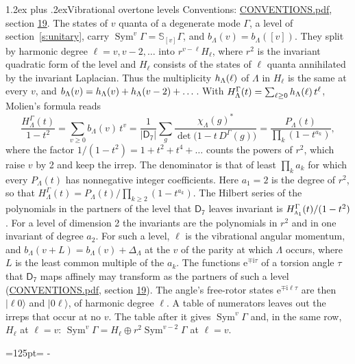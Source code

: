 \documentclass[10pt,a4paper]{article}
\makeatletter
\renewcommand\section{\@startsection{section}{1}{\z@}{-3ex plus -1ex minus -.2ex}%
  {1.2ex plus .2ex}{\normalfont\large\sffamily\bfseries\color{parttitle}}}
\newcommand{\needspace}[1]{\par\penalty-100\begingroup\dimen0=#1\relax\dimen2=\pagegoal
  \advance\dimen2-\pagetotal\ifdim\dimen0>\dimen2\relax\ifdim\dimen2>0pt\vfil\break\fi\fi
  \endgroup}
\numberwithin{equation}{section}
\newcommand{\grp}[1]{\mathsf{#1}}
\newcommand{\irr}[1]{\text{\normalfont\scshape #1}}
\newcommand{\iunit}{\mathrm{i}}
\newcommand{\expe}{\mathrm{e}}
\newcommand{\repD}[1]{D^{#1}}
\newcommand{\irchar}[1]{\chi_{#1}}
\newcommand{\conj}[1]{{#1}^{*}}
\newcommand{\schur}[1]{\mathbb{S}_{#1}}
\newcommand{\shape}[1]{[#1]}
\newcommand{\occ}[1]{\lvert #1\rangle}
\makeatother
\begin{document}
\section{Vibrational overtone levels}\label{s:overtones}
Conventions: \href{../../CONVENTIONS.pdf}{CONVENTIONS.pdf}, section \href{../../CONVENTIONS.pdf\#conv.19}{19}.
\leavevmode\label{n:index.quanta}\label{n:operator.symmetric.power}The states of $v$ quanta of a degenerate mode $\Gamma$, a level of section~\ref{s:unitary}, carry $\operatorname{Sym}^{v}\Gamma = \schur{\shape{v}}\Gamma$, and $b_\Lambda(v) = b_\Lambda(\shape{v})$. \label{n:local.quadratic.form}\label{n:set.harmonic}They split by harmonic degree $\ell = v, v - 2, \dots$ into $r^{v-\ell}H_\ell$, where $r^2$ is the invariant quadratic form of the level and $H_\ell$ consists of the states of $\ell$ quanta annihilated by the invariant Laplacian. \label{n:function.multiplicity.harmonic}Thus the multiplicity $\mathnormal{h}_\Lambda(\ell)$ of $\Lambda$ in $H_\ell$ is the same at every $v$, and $b_\Lambda(v) = \mathnormal{h}_\Lambda(v) + \mathnormal{h}_\Lambda(v - 2) + \dots$. \label{n:function.generating.level}With $H^{\Gamma}_\Lambda(t) = \sum_{\ell\ge0} \mathnormal{h}_\Lambda(\ell)\,t^{\ell}$, Molien's formula reads
\begin{equation}\label{e:molien}\frac{H^{\Gamma}_\Lambda(t)}{1 - t^2} = \sum_{v\ge0} b_\Lambda(v)\,t^v = \frac{1}{|\grp{D_{7}}|}\sum_{g}\frac{\conj{\irchar{\Lambda}(g)}}{\det\bigl(1 - t\,\repD{\Gamma}(g)\bigr)} = \frac{P_\Lambda(t)}{\prod_k (1-t^{a_k})},\end{equation}
where the factor $1/(1 - t^2) = 1 + t^2 + t^4 + \dots$ counts the powers of $r^2$, which raise $v$ by 2 and keep the irrep. The denominator is that of least $\prod_k a_k$ for which every $P_\Lambda(t)$ has nonnegative integer coefficients. Here $a_1 = 2$ is the degree of $r^2$, so that $H^{\Gamma}_\Lambda(t) = P_\Lambda(t)/\prod_{k\ge2}(1 - t^{a_k})$. The Hilbert series of the polynomials in the partners of the level that $\grp{D_{7}}$ leaves invariant is $H^{\Gamma}_{\irr{a}_{1}}(t)/(1 - t^2)$. For a level of dimension 2 the invariants are the polynomials in $r^2$ and in one invariant of degree $a_2$. \label{n:index.overtone.period}\label{n:index.increment.unitary}For such a level, $\ell$ is the vibrational angular momentum, and $b_\Lambda(v + L) = b_\Lambda(v) + \Delta_\Lambda$ at the $v$ of the parity at which $\Lambda$ occurs, where $L$ is the least common multiple of the $a_k$. \label{n:local.torsion.angle}The functions $\expe^{\mp\iunit\tau}$ of a torsion angle $\tau$ that $\grp{D_{7}}$ maps affinely may transform as the partners of such a level (\href{../../CONVENTIONS.pdf}{CONVENTIONS.pdf}, section \href{../../CONVENTIONS.pdf\#conv.19}{19}). The angle's free-rotor states $\expe^{\mp\iunit\ell\tau}$ are then $\occ{\ell 0}$ and $\occ{0 \ell}$, of harmonic degree $\ell$. A table of numerators leaves out the irreps that occur at no $v$. The table after it gives $\operatorname{Sym}^{v}\Gamma$ and, in the same row, $H_\ell$ at $\ell = v$: $\operatorname{Sym}^{v}\Gamma = H_\ell \oplus r^2\operatorname{Sym}^{v-2}\Gamma$ at $\ell = v$.
\needspace{125pt}
\end{document}
